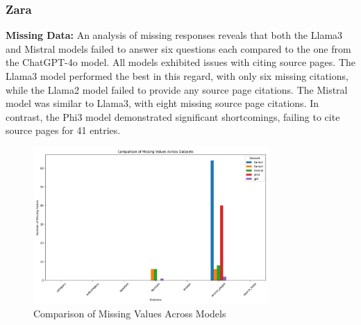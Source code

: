\documentclass[]{article}
\begin{document}
\subsubsection{Zara}
\textbf{Missing Data:} An analysis of missing responses reveals that both the Llama3 and 
Mistral models failed to answer six questions each compared to the one from the ChatGPT-4o model.
All models exhibited issues with citing source pages. 
The Llama3 model performed the best in this regard, with only six missing citations, 
while the Llama2 model failed to provide any source page citations. The Mistral model was similar to Llama3, 
with eight missing source page citations. In contrast, the Phi3 model demonstrated significant shortcomings, 
failing to cite source pages for 41 entries.

\begin{figure}[H]
    \centering
    \includegraphics[width=0.8\textwidth]{./images/Missing_Values.png}
    \caption{Comparison of Missing Values Across Models}
    \label{fig:image_label}
\end{figure}
\end{document}
